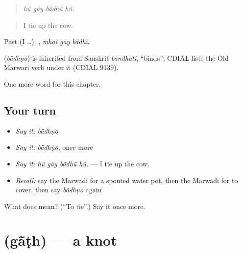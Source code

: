 \begin{quote}
   
\end{quote}

\begin{quote}
\emph{hū̃ gāy bā̃dhū̃ hū̃.}
\end{quote}

\begin{quote}
I tie up the cow.
\end{quote}

Past (I …):   , \emph{mhaĩ gāy bā̃dhī}.

\begin{cousinweb}
\textbf{} (\emph{bā̃dhṇo}) is inherited from Sanskrit \emph{bandhati}, \textquotedblleft{}binds\textquotedblright{}; CDIAL lists the Old Marwari verb under it (CDIAL 9139).
\end{cousinweb}

\begin{grammarlens}[title={What you've built}]
One more word for this chapter.
\end{grammarlens}

\subsection*{Your turn}
\begin{itemize}
\raggedright
  \item \emph{Say it:} \emph{bā̃dhṇo}
  \item \emph{Say it:} \emph{bā̃dhṇo}, once more
  \item \emph{Say it:} \emph{hū̃ gāy bā̃dhū̃ hū̃.} — I tie up the cow.
  \item \emph{Recall:} say the Marwadi for a spouted water pot, then the Marwadi for to cover, then say \emph{bā̃dhṇo} again
\end{itemize}

\begin{tcolorbox}[breakable,colback=teal!4,colframe=teal!35!black,title={Before you move on}]
What does  mean? (\textquotedblleft{}To tie\textquotedblright{}.) Say it once more.
\end{tcolorbox}
\section[\texorpdfstring{\mw{गांठ} (gā̃ṭh)}{गांठ (gā̃ṭh)}]{ (gā̃ṭh) — a knot}

\label{lesson:MW-C176-gath}



